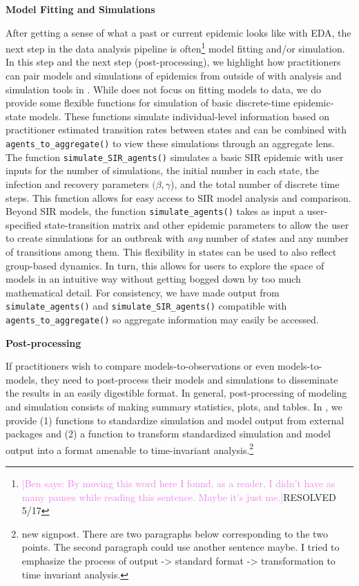 \documentclass[
  shortnames]{jss}
\begin{document}
\textbf{Model Fitting and Simulations}

After getting a sense of what a past or current epidemic looks like with
EDA, the next step in the data analysis pipeline is
often\footnote{\textcolor{violet}{[Ben says: By moving this word here I found, as a reader, I didn't have as many pauses while reading this sentence. Maybe it's just me.]}RESOLVED 5/17}
model fitting and/or simulation. In this step and the next step
(post-processing), we highlight how practitioners can pair models and
simulations of epidemics from outside of  with analysis
and simulation tools in . While  does
not focus on fitting models to data, we do provide some flexible
functions for simulation of basic discrete-time epidemic-state models.
These functions simulate individual-level information based on
practitioner estimated transition rates between states and can be
combined with \texttt{agents\_to\_aggregate()} to view these simulations
through an aggregate lens. The function \texttt{simulate\_SIR\_agents()}
simulates a basic SIR epidemic with user inputs for the number of
simulations, the initial number in each state, the infection and
recovery parameters \((\beta, \gamma\)), and the total number of
discrete time steps. This function allows for easy access to SIR model
analysis and comparison. Beyond SIR models, the function
\texttt{simulate\_agents()} takes as input a user-specified
state-transition matrix and other epidemic parameters to allow the user
to create simulations for an outbreak with \textit{any} number of states
and any number of transitions among them. This flexibility in states can
be used to also reflect group-based dynamics. In turn, this allows for
users to explore the space of models in an intuitive way without getting
bogged down by too much mathematical detail. For consistency, we have
made output from \texttt{simulate\_agents()} and
\texttt{simulate\_SIR\_agents()} compatible with
\texttt{agents\_to\_aggregate()} so aggregate information may easily be
accessed.

\textbf{Post-processing}

If practitioners wish to compare models-to-observations or even
models-to-models, they need to post-process their models and simulations
to disseminate the results in an easily digestible format. In general,
post-processing of modeling and simulation consists of making summary
statistics, plots, and tables. In , we provide (1)
functions to standardize simulation and model output from external
packages and (2) a function to transform standardized simulation and
model output into a format amenable to time-invariant
analysis.\footnote{new signpost.  There are two paragraphs below corresponding to the two points.  The second paragraph could use another sentence maybe.  I tried to emphasize the process of output -> standard format -> transformation to time invariant analysis.}
\end{document}
